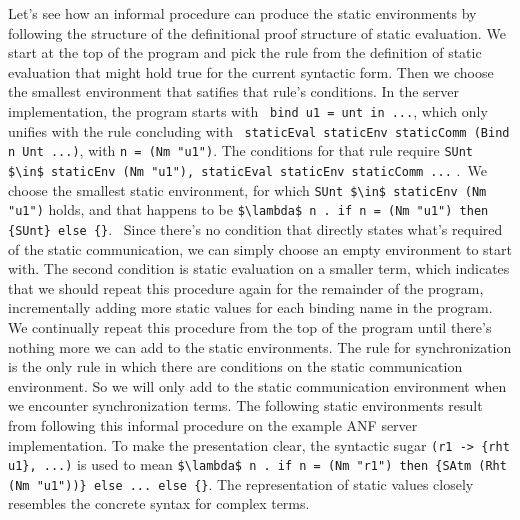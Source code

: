 \documentclass[letterpaper, 11pt]{report}
\begin{document}
Let's see how an informal procedure can produce the static environments by following the
structure of the definitional proof structure of static evaluation.
We start at the top of the program and pick the 
rule from the definition of static evaluation that might hold true for the current syntactic form.
Then we choose the smallest environment that satifies that rule's conditions. 
In the server implementation, the program starts with \
\lstinline[language=normal_lang, mathescape]{bind u1 = unt in ...}, which only unifies with 
the rule concluding with \
\lstinline[language=logic, mathescape]{staticEval staticEnv staticComm (Bind n Unt ...)},
with \lstinline[language=logic, mathescape]{n = (Nm "u1")}. 
The conditions for that rule require 
\lstinline[language=logic, mathescape]{SUnt $\in$ staticEnv (Nm "u1"), staticEval staticEnv staticComm ...} .\
We choose the smallest static environment, for which
\lstinline[language=logic]{SUnt $\in$ staticEnv (Nm "u1")} holds, and that happens to be 
\lstinline[language=logic]|$\lambda$ n . if n = (Nm "u1") then {SUnt} else {}|. \
Since there's no condition that directly states what's required of the static communication, we can
simply choose an empty environment to start with. The second condition is static evaluation on
a smaller term, which indicates that we should repeat this procedure again for the remainder of
the program, incrementally adding more static values for each binding name in the program.
We continually repeat this procedure from the top of the program until there's
nothing more we can add to the static environments.
The rule for synchronization is the only rule in which there are conditions on
the static communication environment. So we will only add to the static communication
environment when we encounter synchronization terms.
The following static environments result from following this informal procedure on
the example ANF server implementation.
To make the presentation clear, the syntactic sugar \lstinline|(r1 -> {rht u1}, ...)| is used 
to mean \lstinline[language=logic]|$\lambda$ n . if n = (Nm "r1") then {SAtm (Rht (Nm "u1"))} else ... else {}|.
The representation of static values closely resembles the concrete syntax for complex terms.
\end{document}
